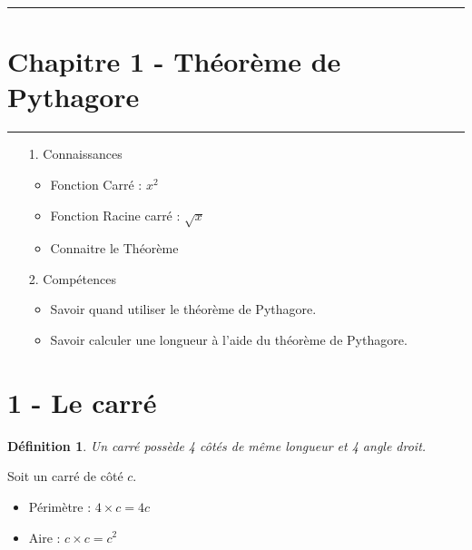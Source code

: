 \documentclass[11pt]{article}
\newcommand{\horrule}[1]{\rule{\linewidth}{#1}} %
\begin{document}

\newtheorem{Definition}{Définition}
\newtheorem{Theorem}{Théorème}
\newtheorem{Proposition}{Propriété}

\renewcommand{\labelitemi}{$\bullet$}
\renewcommand{\labelitemii}{$\circ$}

\setlength{\columnseprule}{1pt}

\horrule{2px}
\section*{Chapitre 1 - Théorème de Pythagore}
\horrule{2px}

\begin{enumerate}
    \item[1.] Connaissances
    \begin{itemize}
        \item Fonction Carré : $x^2$
        \item Fonction Racine carré : $\sqrt{x}$ 
        \item Connaitre le Théorème
    \end{itemize}
    \item[2.] Compétences
    \begin{itemize}
        \item Savoir quand utiliser le théorème de Pythagore.
        \item Savoir calculer une longueur à l'aide du théorème de Pythagore.
    \end{itemize}
\end{enumerate}

\section*{1 - Le carré}

\begin{Definition}
    Un carré possède 4 côtés de même longueur et 4 angle droit.
\end{Definition}

Soit un carré de côté $c$.
\begin{itemize}
    \item Périmètre : $4 \times c = 4c$
    \item Aire : $c \times c = c^2$ 
\end{itemize}
\end{document}
